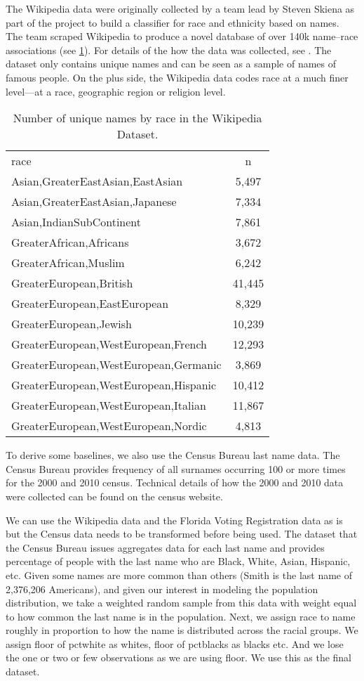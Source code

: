 \documentclass[12pt, letterpaper]{article}
\begin{document}
The Wikipedia data were originally collected by a team lead by Steven Skiena as part of the project to build a classifier for race and ethnicity based on names. The team scraped Wikipedia to produce a novel database of over 140k name--race associations (see \ref{table:wikipedia_data}). For details of the how the data was collected, see \citet{ambekar2009name}. The dataset only contains unique names and can be seen as a sample of names of famous people. On the plus side, the Wikipedia data codes race at a much finer level---at a race, geographic region or religion level. 

\begin{table}[h!]
\centering
\caption{Number of unique names by race in the Wikipedia Dataset.}
\begin{tabular}{ l c }
\hline	
race & n \\
Asian,GreaterEastAsian,EastAsian & 5,497 \\
Asian,GreaterEastAsian,Japanese & 7,334 \\
Asian,IndianSubContinent & 7,861 \\
GreaterAfrican,Africans & 3,672 \\
GreaterAfrican,Muslim & 6,242 \\
GreaterEuropean,British & 41,445 \\
GreaterEuropean,EastEuropean & 8,329 \\
GreaterEuropean,Jewish & 10,239 \\
GreaterEuropean,WestEuropean,French & 12,293 \\
GreaterEuropean,WestEuropean,Germanic & 3,869 \\
GreaterEuropean,WestEuropean,Hispanic & 10,412 \\
GreaterEuropean,WestEuropean,Italian & 11,867 \\
GreaterEuropean,WestEuropean,Nordic & 4,813 \\
\end{tabular}
\label{table:wikipedia_data}
\end{table}

To derive some baselines, we also use the Census Bureau last name data. The Census Bureau provides frequency of all surnames occurring 100 or more times for the 2000 and 2010 census. Technical details of how the 2000 and 2010 data were collected can be found on the census website. 

We can use the Wikipedia data and the Florida Voting Registration data as is but the Census data needs to be transformed before being used. The dataset that the Census Bureau issues aggregates data for each last name and provides percentage of people with the last name who are Black, White, Asian, Hispanic, etc. Given some names are more common than others (Smith is the last name of 2,376,206 Americans), and given our interest in modeling the population distribution, we take a weighted random sample from this data with weight equal to how common the last name is in the population. Next, we assign race to name roughly in proportion to how the name is distributed across the racial groups. We assign floor of pctwhite as whites, floor of pctblacks as blacks etc. And we lose the one or two or few observations as we are using floor. We use this as the final dataset.
\end{document}
